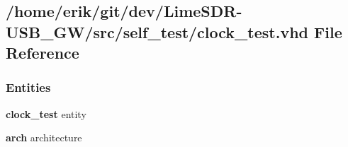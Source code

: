 \subsection{/home/erik/git/dev/\+Lime\+S\+D\+R-\/\+U\+S\+B\+\_\+\+G\+W/src/self\+\_\+test/clock\+\_\+test.vhd File Reference}
\label{clock__test_8vhd}
\subsubsection*{Entities}
\begin{DoxyCompactItemize}
\item 
{\bf clock\+\_\+test} entity
\item 
{\bf arch} architecture
\end{DoxyCompactItemize}
